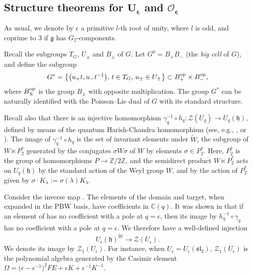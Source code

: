 \documentclass[10pt,a4paper]{amsart}
\numberwithin{equation}{section}
\theoremstyle{definition}
\newcommand{\e}{\epsilon}
\newcommand{\mc}{\mathbb{C}}
\newcommand{\mz}{\mathbb{Z}}
\newcommand{\Oo}{{\mathcal O}}
\newcommand{\ra}{\rightarrow}
\begin{document}
\subsection[Structure theorems for U\_e and O\_e]{Structure theorems for $\boldsymbol{U_\e}$ and $\boldsymbol{\Oo_\e}$} \label{UOUlf}
As usual, we denote by $\e$ a primitive $l$-th root of unity, where $l$ is odd, and coprime to $3$ if $\mathfrak{g}$ has $G_2$-components.

Recall the subgroups $T_G$, $U_\pm$ and $B_\pm$ of $G$. Let $G^0 = B_+B_-$ (the {\it big cell} of $G$), and define the subgroup
\[G^* = \big\{\big(u_+t,u_-t^{-1}\big), \,t\in T_G,\, u_\pm \in U_\pm\big\}\subset B_+^{\rm op}\times B_-^{\rm op},\]
where $B_\pm^{\rm op}$ is the group $B_\pm$ with opposite multiplication. The group $G^*$ can be naturally identified with the Poisson--Lie dual of $G$ with its standard structure.


Recall also that there is an injective homomorphism $\gamma_q^{-1}\circ h_q\colon \mathcal{Z}(U_q) \ra U_q(\mathfrak{h})$, defined by means of the quantum Harish-Chandra homomorphism (see, e.g., \cite[Section 9.1.C]{CP}, or \cite[Section 3.13]{VY}). The image of $\gamma_q^{-1}\circ h_q$ is the set  of invariant elements under $\tilde{W}$, the subgroup of $W\ltimes P_2^*$ generated by the conjugates $\sigma W \sigma$ of $W$ by elements $\sigma\in P_2^*$. Here, $P_2^*$ is the group of homomorphisms $P\ra \mz/2\mz$, and the semidirect product $W\ltimes P_2^*$ acts on $U_q(\mathfrak{h})$ by the standard action of the Weyl group $W$, and by the action of $P_2^*$ given by $\sigma\cdot K_\lambda := \sigma(\lambda)K_\lambda$.

Consider the inverse map \smash{$h_q^{-1}\circ \gamma_q \colon U_q(\mathfrak{h})^{\tilde{W}} \ra \mathcal{Z}(U_q)$}. The elements of the domain and target, when expanded in the PBW basis, have coefficients in $\mc(q)$. It was shown in \cite[Section 21.1]{DC-K-P2} that if an element of  has no coefficient with a pole at $q=\e$, then its image by $h_q^{-1}\circ \gamma_q$ has no coefficient with a pole at $q=\e$. We therefore have a well-defined injection
\[U_\e(\mathfrak{h})^{\tilde{W}}\ra \mathcal{Z}(U_\e).\]
We denote its image by $\mathcal{Z}_1(U_\e)$. For instance, when $U_\e = U_\e({\mathfrak{sl}_2})$, $\mathcal{Z}_1(U_\e)$ is the polynomial algebra generated by the Casimir element $\Omega=\big(\e-\e^{-1}\big)^2FE+\e K+\e^{-1}K^{-1}$.
\end{document}
